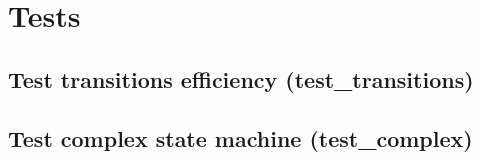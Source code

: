 \section{Tests}

\subsection{Test transitions efficiency (test\_transitions)}


\subsection{Test complex state machine (test\_complex)}


